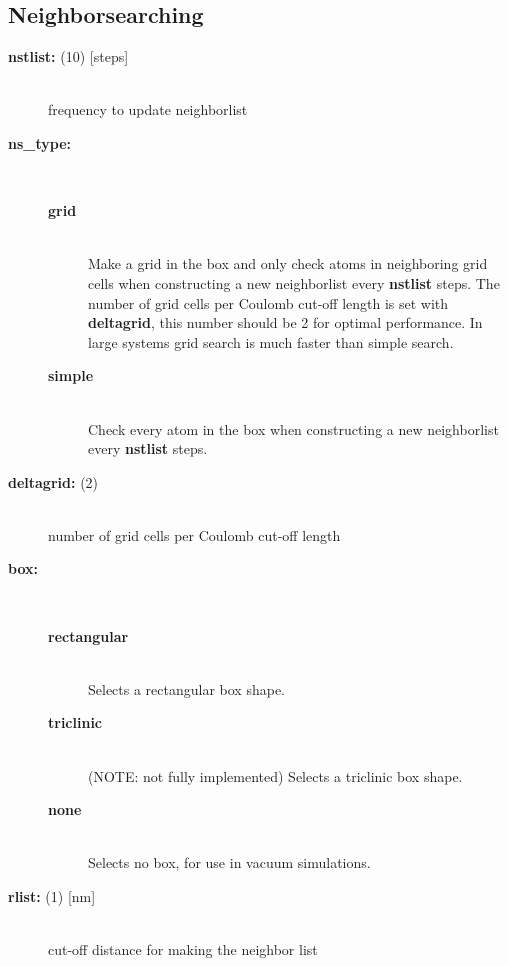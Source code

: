 \subsection{Neighborsearching}
\begin{description}
\item[{\bf nstlist: }(10) {[steps]}]\mbox{}\\
frequency to update neighborlist
\item[{\bf ns\_type:}]\mbox{}\\
\vspace{-2ex}\begin{description}
\item[{\bf grid}]\mbox{}\\
Make a grid in the box and only check atoms in neighboring 
grid cells when constructing a new neighborlist every {\bf nstlist} steps. 
The number of grid cells per Coulomb cut-off length is set with 
{\bf deltagrid},
this number should be 2 for optimal performance.
In large systems grid search is much faster than simple search. 
\item[{\bf simple}]\mbox{}\\
Check every atom in the box when constructing a new neighborlist
every {\bf nstlist} steps.
\end{description}
\item[{\bf deltagrid: }(2)]\mbox{}\\
number of grid cells per Coulomb cut-off length
\item[{\bf box:}]\mbox{}\\
\vspace{-2ex}\begin{description}
\item[{\bf rectangular}]\mbox{}\\
Selects a rectangular box shape.
\item[{\bf triclinic}]\mbox{}\\
(NOTE: not fully implemented) Selects a triclinic box shape.
\item[{\bf none}]\mbox{}\\
Selects no box, for use in vacuum simulations.
\end{description}
\item[{\bf rlist: }(1) {[nm]}]\mbox{}\\
cut-off distance for making the neighbor list
\end{description}

